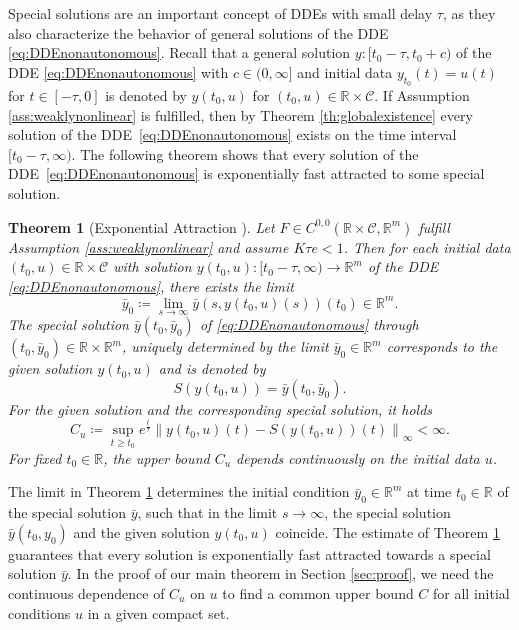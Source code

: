 \documentclass[10pt]{article}
\numberwithin{equation}{section}
\newtheorem{theorem}{Theorem}[section]
\newcommand\norm[1]{\left\lVert#1\right\rVert}
\begin{document}
	Special solutions are an important concept of DDEs with small delay $\tau$, as they also characterize the behavior of general solutions of the DDE \eqref{eq:DDEnonautonomous}. Recall that a general solution $y:[t_0-\tau,t_0+c)$ of the DDE \eqref{eq:DDEnonautonomous} with $c \in(0,\infty]$ and initial data $y_{t_0}(t) = u(t)$ for $t\in[-\tau,0]$ is denoted by $y(t_0,u)$ for $(t_0,u) \in \mathbb{R}\times \mathcal{C}$. If Assumption \ref{ass:weaklynonlinear} is fulfilled, then by Theorem \ref{th:globalexistence} every solution of the DDE~\eqref{eq:DDEnonautonomous} exists on the time interval $[t_0-\tau,\infty)$. The following theorem shows that every solution of the DDE~\eqref{eq:DDEnonautonomous} is exponentially fast attracted to some special solution.
	
	\begin{theorem}[Exponential Attraction \cite{Jarnik1975}] \label{th:specialsolutions_expattraction}
		Let  $F\in C^{0,0}(\mathbb{R}\times \mathcal{C}, \mathbb{R}^m)$ fulfill Assumption \ref{ass:weaklynonlinear} and assume $K \tau e < 1$. Then for each initial data $(t_0,u)\in\mathbb{R}\times \mathcal{C}$ with solution $y(t_0,u):[t_0-\tau,\infty)\rightarrow \mathbb{R}^m$ of the DDE \eqref{eq:DDEnonautonomous}, there exists the limit
		\begin{equation}\label{eq:ICspecialsolution}
			\bar{y}_0 \coloneqq \lim_{s \rightarrow \infty} \bar{y}(s,y(t_0,u)(s))(t_0) \in \mathbb{R}^m.
		\end{equation}
		The special solution $\bar{y}(t_0,\bar{y}_0)$ of \eqref{eq:DDEnonautonomous} through $(t_0,\bar{y}_0)\in \mathbb{R}\times \mathbb{R}^m$, uniquely determined by the limit $\bar{y}_0\in \mathbb{R}^m$ corresponds to the given solution $y(t_0,u)$ and is denoted by 
		\begin{equation*}
			S(y(t_0,u)) = \bar{y}(t_0,\bar{y}_0).
		\end{equation*} 
		For the given solution and the corresponding special solution, it holds
		\begin{equation*}
			C_u \coloneqq \sup_{t \geq t_0} e^{\frac{t}{\tau}} \norm{y(t_0,u)(t)-S(y(t_0,u))(t)}_\infty < \infty.
		\end{equation*}
		For fixed $t_0 \in \mathbb{R}$, the upper bound $C_u$ depends continuously on the initial data $u$.
	\end{theorem}
	
	The limit in Theorem \ref{th:specialsolutions_expattraction} determines the initial condition $\bar{y}_0 \in\mathbb{R}^m$ at time $t_0 \in \mathbb{R}$ of the special solution $\bar{y}$, such that in the limit $s \rightarrow \infty$, the special solution $\bar{y}(t_0,y_0)$ and the given solution $y(t_0,u)$ coincide. The estimate of Theorem \ref{th:specialsolutions_expattraction} guarantees that every solution is exponentially fast attracted towards a special solution $\bar{y}$. In the proof of our main theorem in Section \ref{sec:proof}, we need the continuous dependence of $C_u$ on $u$ to find a common upper bound $C$ for all initial conditions $u$ in a given compact set.
	
\end{document}

